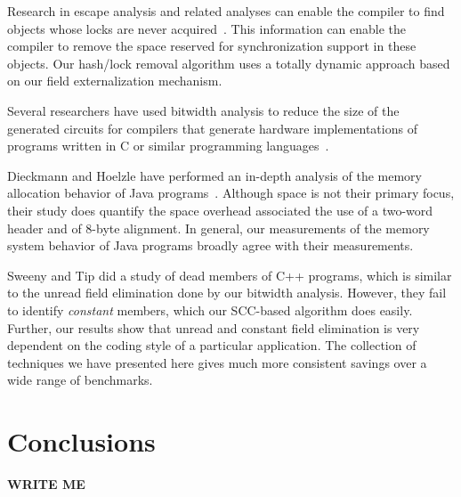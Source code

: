 \documentclass{acmconf}
\begin{document}
Research in escape analysis and related analyses can enable the
compiler to find objects whose locks are never 
acquired~\cite{ACSE99,BH99,WR99:OOPSLA99,CGSSM99,Ruf00:PLDI00,SR01:PPOPP01}.
This information can enable the compiler to remove the space
reserved for synchronization support in these objects. 
Our hash/lock removal algorithm uses a totally dynamic approach
based on our field externalization mechanism. 

Several researchers have used bitwidth analysis to reduce the size
of the generated circuits for compilers that generate hardware
implementations of programs written in C or similar programming 
languages~\cite{ananian:siliconc,RR00:PLDI00,SBA00:PLDI00,BGSW00}.

Dieckmann and Hoelzle have performed an in-depth analysis of the
memory allocation behavior of Java programs~\cite{DH99}. Although 
space is not their primary focus, their study does quantify 
the space overhead associated the use of a two-word header
and of 8-byte alignment. In general, our measurements of the 
memory system behavior of Java programs broadly agree with their
measurements. 

Sweeny and Tip \cite{SweeneyTip98DeadDataMembers} did a study of dead
members of C++ programs, which is similar to the unread field
elimination done by our bitwidth analysis.  However, they
fail to identify {\it constant} members, which our SCC-based algorithm
does easily.  Further, our results show that unread and constant field
elimination is very dependent on the coding style of a particular
application.  The collection of techniques we have presented here
gives much more consistent savings over a wide range of benchmarks.



\section{Conclusions}

{\bf\Large WRITE ME}



%
\end{document}
